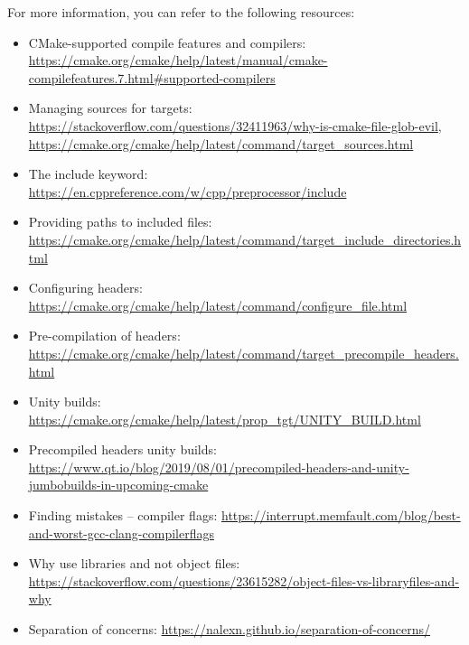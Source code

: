 For more information, you can refer to the following resources:

\begin{itemize}
\item
CMake-supported compile features and compilers: \url{https://cmake.org/cmake/help/latest/manual/cmake-compilefeatures.7.html#supported-compilers}

\item
Managing sources for targets: \url{https://stackoverflow.com/questions/32411963/why-is-cmake-file-glob-evil}, \url{https://cmake.org/cmake/help/latest/command/target_sources.html}

\item
The include keyword: \url{https://en.cppreference.com/w/cpp/preprocessor/include}

\item
Providing paths to included files: \url{https://cmake.org/cmake/help/latest/command/target_include_directories.html}

\item
Configuring headers: \url{https://cmake.org/cmake/help/latest/command/configure_file.html}

\item
Pre-compilation of headers: \url{https://cmake.org/cmake/help/latest/command/target_precompile_headers.html}

\item
Unity builds: \url{https://cmake.org/cmake/help/latest/prop_tgt/UNITY_BUILD.html}

\item
Precompiled headers unity builds: \url{https://www.qt.io/blog/2019/08/01/precompiled-headers-and-unity-jumbobuilds-in-upcoming-cmake}

\item
Finding mistakes – compiler flags: \url{https://interrupt.memfault.com/blog/best-and-worst-gcc-clang-compilerflags}

\item
Why use libraries and not object files: \url{https://stackoverflow.com/questions/23615282/object-files-vs-libraryfiles-and-why}

\item
Separation of concerns: \url{https://nalexn.github.io/separation-of-concerns/}
\end{itemize}